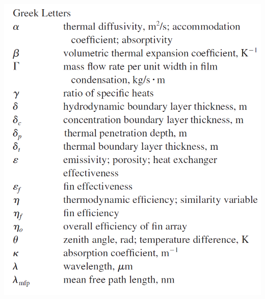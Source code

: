 \documentclass[10pt,landscape]{article}
\newenvironment{Figure}
     {\par\medskip\noindent\minipage{\linewidth}}
     {\endminipage\par\medskip}
\begin{document}
\begin{multicols}{3}
\begin{Figure}
    \includegraphics[width=\linewidth]{Symbols_6.png}
\end{Figure}
\begin{Figure}
    \centering

\end{Figure}
\end{multicols}
\end{document}
